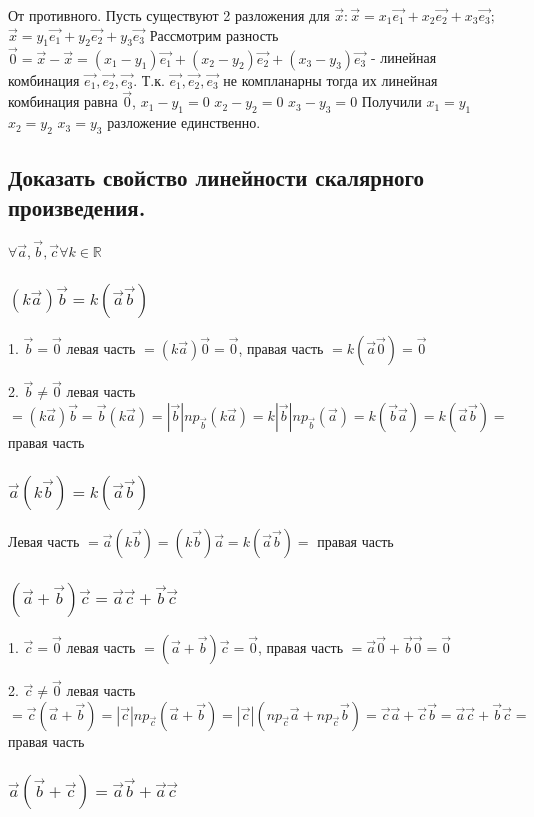 \documentclass[a4paper, 10pt]{article}
\renewcommand{\a}{\vec{a}}
\renewcommand{\b}{\vec{b}}
\renewcommand{\c}{\vec{c}}
\newcommand{\nul}{\vec{0}}
\begin{document}
От противного. Пусть существуют 2 разложения для 
$\vec{x}: \vec{x} = x_1\vec{e_1} + x_2\vec{e_2} + x_3\vec{e_3};$
$\vec{x} = y_1\vec{e_1} + y_2\vec{e_2} + y_3\vec{e_3}$
Рассмотрим разность $\nul = \vec{x} - \vec{x} = 
(x_1 - y_1)\vec{e_1} + (x_2 - y_2)\vec{e_2} + (x_3 - y_3)\vec{e_3}$ - линейная комбинация 
$\vec{e_1}, \vec{e_2}, \vec{e_3}$. Т.к. $\vec{e_1}, \vec{e_2}, \vec{e_3}$ не компланарны
тогда их линейная комбинация равна $\nul$, $x_1 - y_1 = 0$ $x_2 - y_2 = 0$ $x_3 - y_3 = 0$
Получили $x_1 = y_1$ $x_2 = y_2$ $x_3 = y_3$ разложение единственно.

\subsection{Доказать свойство линейности скалярного произведения.}

\begin{center}
    $\forall \a, \b, \c \forall k \in \mathbb{R}$
\end{center}

\subsubsection{$(k\a)\b = k(\a\b)$}

1. $\b = \nul$ левая часть $ = (k\a)\nul = \nul$, правая часть $ = k(\a\nul) = \nul$

2. $\b \ne \nul$ левая часть $ = (k\a)\b = \b(k\a) = |\b|np_{\b}(k\a) =
k|\b|np_{\b}(\a) = k(\b\a) = k(\a\b) = $ правая часть

\subsubsection{$\a(k\b) = k(\a\b)$}

Левая часть $ = \a(k\b) = (k\b)\a = k(\a\b) = $ правая часть

\subsubsection{$(\a + \b)\c = \a\c + \b\c$}

1. $\c = \nul$ левая часть $ = (\a + \b)\c = \nul$, 
правая часть $ = \a\nul + \b\nul = \nul$

2. $\c \ne \nul$ левая часть $ = \c(\a + \b) = |\c|np_{\c}(\a + \b) =
|\c|(np_{\c}\a + np_{\c}\b) = \c\a + \c\b = 
\a\c + \b\c = $ правая часть

\subsubsection{$\a(\b + \c) = \a\b + \a\c$}
\end{document}
